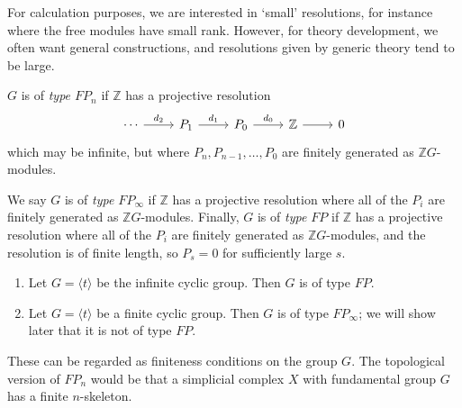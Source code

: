 For calculation purposes, we are interested in `small' resolutions, for instance where the free modules have small rank.
However, for theory development, we often want general constructions, and resolutions given by generic theory tend to be large.
\begin{definition}
    \( G \) is of \emph{type \( FP_n \)} if \( \mathbb Z \) has a projective resolution
    \[\begin{tikzcd}
        \cdots & {P_1} & {P_0} & {\mathbb Z} & 0
        \arrow["{d_2}", from=1-1, to=1-2]
        \arrow["{d_1}", from=1-2, to=1-3]
        \arrow["{d_0}", from=1-3, to=1-4]
        \arrow[from=1-4, to=1-5]
    \end{tikzcd}\]
    which may be infinite, but where \( P_n, P_{n-1}, \dots, P_0 \) are finitely generated as \( \mathbb Z G \)-modules.

    We say \( G \) is of \emph{type \( FP_\infty \)} if \( \mathbb Z \) has a projective resolution where all of the \( P_i \) are finitely generated as \( \mathbb Z G \)-modules.
    Finally, \( G \) is of \emph{type \( FP \)} if \( \mathbb Z \) has a projective resolution where all of the \( P_i \) are finitely generated as \( \mathbb Z G \)-modules, and the resolution is of finite length, so \( P_s = 0 \) for sufficiently large \( s \).
\end{definition}
\begin{example}
    \begin{enumerate}
        \item Let \( G = \langle t \rangle \) be the infinite cyclic group.
        Then \( G \) is of type \( FP \).
        \item Let \( G = \langle t \rangle \) be a finite cyclic group.
        Then \( G \) is of type \( FP_\infty \); we will show later that it is not of type \( FP \).
    \end{enumerate}
\end{example}
These can be regarded as finiteness conditions on the group \( G \).
The topological version of \( FP_n \) would be that a simplicial complex \( X \) with fundamental group \( G \) has a finite \( n \)-skeleton.

